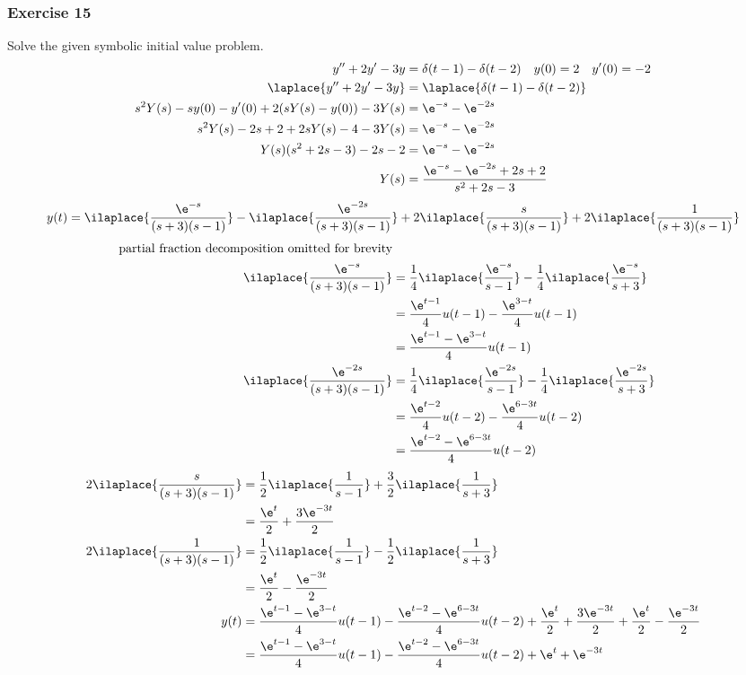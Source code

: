\documentclass{math}
\begin{document}
\subsubsection*{Exercise 15}
Solve the given symbolic initial value problem.
\begin{align*}
  y''+2y'-3y &= \delta(t-1)-\delta(t-2) \quad y(0) = 2 \quad y'(0) = -2 \\
  \laplace{y''+2y'-3y} &= \laplace{\delta(t-1)-\delta(t-2)} \\
  s^2Y(s)-sy(0)-y'(0)+2(sY(s)-y(0))-3Y(s) &= \e^{-s}-\e^{-2s} \\
  s^2Y(s)-2s+2+2sY(s)-4-3Y(s) &= \e^{-s}-\e^{-2s} \\
  Y(s)(s^2+2s-3)-2s-2 &= \e^{-s}-\e^{-2s} \\
  Y(s) &= \frac{\e^{-s}-\e^{-2s}+2s+2}{s^2+2s-3}
\end{align*}
\[ y(t) = \ilaplace{\frac{\e^{-s}}{(s+3)(s-1)}}-
    \ilaplace{\frac{\e^{-2s}}{(s+3)(s-1)}}+
    2\ilaplace{\frac{s}{(s+3)(s-1)}}+
    2\ilaplace{\frac{1}{(s+3)(s-1)}} \]
\begin{align*}
  \text{partial fraction decomposition omitted for brevity} \\
  \ilaplace{\frac{\e^{-s}}{(s+3)(s-1)}} &=
    \frac{1}{4}\ilaplace{\frac{\e^{-s}}{s-1}}-
    \frac{1}{4}\ilaplace{\frac{\e^{-s}}{s+3}} \\
  &= \frac{\e^{t-1}}{4}u(t-1)-\frac{\e^{3-t}}{4}u(t-1) \\
  &= \frac{\e^{t-1}-\e^{3-t}}{4}u(t-1) \\
  \ilaplace{\frac{\e^{-2s}}{(s+3)(s-1)}} &=
    \frac{1}{4}\ilaplace{\frac{\e^{-2s}}{s-1}}-
    \frac{1}{4}\ilaplace{\frac{\e^{-2s}}{s+3}} \\
  &= \frac{\e^{t-2}}{4}u(t-2)-\frac{\e^{6-3t}}{4}u(t-2) \\
  &= \frac{\e^{t-2}-\e^{6-3t}}{4}u(t-2) \\
\end{align*}
\begin{align*}
  2\ilaplace{\frac{s}{(s+3)(s-1)}} &=
    \frac{1}{2}\ilaplace{\frac{1}{s-1}}+\frac{3}{2}\ilaplace{\frac{1}{s+3}} \\
  &= \frac{\e^{t}}{2}+\frac{3\e^{-3t}}{2} \\
  2\ilaplace{\frac{1}{(s+3)(s-1)}} &=
    \frac{1}{2}\ilaplace{\frac{1}{s-1}}-\frac{1}{2}\ilaplace{\frac{1}{s+3}} \\
  &= \frac{\e^{t}}{2}-\frac{\e^{-3t}}{2} \\
  y(t) &= \frac{\e^{t-1}-\e^{3-t}}{4}u(t-1)-
    \frac{\e^{t-2}-\e^{6-3t}}{4}u(t-2)+
    \frac{\e^{t}}{2}+\frac{3\e^{-3t}}{2}+
    \frac{\e^{t}}{2}-\frac{\e^{-3t}}{2} \\
  &= \frac{\e^{t-1}-\e^{3-t}}{4}u(t-1)-
    \frac{\e^{t-2}-\e^{6-3t}}{4}u(t-2)+\e^t+\e^{-3t}
\end{align*}
\end{document}
